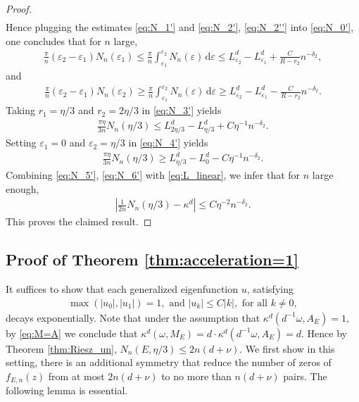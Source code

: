 \documentclass[11pt]{amsart}
\begin{document}
\begin{proof}
\begin{align}
\end{align}
Hence plugging the estimates  \eqref{eq:N_1'} and \eqref{eq:N_2'}, \eqref{eq:N_2''} into \eqref{eq:N_0'}, one concludes that  for $n$ large,
\begin{align}\label{eq:N_3'}
\frac{\pi}{n}(\varepsilon_2-\varepsilon_1) N_n(\varepsilon_1)\leq \frac{\pi}{n}\int_{\varepsilon_1}^{\varepsilon_2} N_n(\varepsilon)\, \mathrm{d}\varepsilon
\leq L^d_{\varepsilon_2}-L^d_{\varepsilon_1}+\frac{C}{R-r_2} n^{-\delta_2},
\end{align}
and
\begin{align}\label{eq:N_4'}
\frac{\pi}{n}(\varepsilon_2-\varepsilon_1) N_n(\varepsilon_2)\geq \frac{\pi}{n}\int_{\varepsilon_1}^{\varepsilon_2} N_n(\varepsilon)\, \mathrm{d}\varepsilon 
\geq L^d_{\varepsilon_2}-L^d_{\varepsilon_1}-\frac{C}{R-r_2}n^{-\delta_2}.
\end{align}
Taking $r_1=\eta/3$ and $r_2=2\eta/3$ in \eqref{eq:N_3'} yields
\begin{align}\label{eq:N_5'}
\frac{\pi \eta}{3n} N_n(\eta/3)\leq L^d_{2\eta/3}-L^d_{\eta/3}+C \eta^{-1} n^{-\delta_2}.
\end{align}
Setting $\varepsilon_1=0$ and $\varepsilon_2=\eta/3$ in \eqref{eq:N_4'} yields
\begin{align}\label{eq:N_6'}
\frac{\pi\eta}{3n} N_n(\eta/3)\geq L^d_{\eta/3}-L^d_{0}-C\eta^{-1} n^{-\delta_2}.
\end{align}
Combining \eqref{eq:N_5'}, \eqref{eq:N_6'} with \eqref{eq:L_linear}, we infer that for $n$ large enough,
\begin{align}\label{eq:N_7'}
\left| \frac{1}{2n} N_n(\eta/3)-\kappa^d\right| \leq C\eta^{-2} n^{-\delta_2}.
\end{align}
This proves the claimed result.
\end{proof}

 
\subsection{Proof of Theorem \ref{thm:acceleration=1}}
It suffices to show that each generalized eigenfunction $u$, satisfying 
\begin{align}\label{eq:Schnol}
\max(|u_0|, |u_1|)=1, \text{ and } 
    |u_k|\leq C|k|, \text{ for all } k\neq 0,
\end{align}
decays exponentially.
Note that under the assumption that $\kappa^d(d^{-1}\omega, A_E)=1$,   by \eqref{eq:M=A}  we conclude that $\kappa^d(\omega,M_E)=d\cdot \kappa^d(d^{-1}\omega,A_E)=d$. 
Hence by Theorem \ref{thm:Riesz_un}, $N_n(E,\eta/3)\leq 2n(d+\nu)$.
We first show in this setting, there is an additional symmetry that reduce the number of zeros of $f_{E,n}(z)$ from at most $2n(d+\nu)$ to no more than $n(d+\nu)$ pairs. The following lemma is essential.
\end{document}
